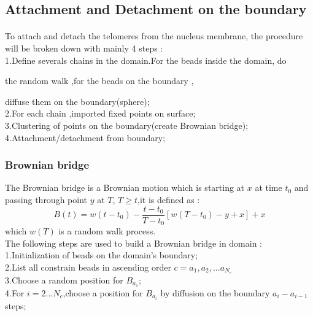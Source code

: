 \documentclass{article}
\begin{document}
\subsection{Attachment and Detachment on the boundary}
\paragraph{}
To attach and detach the telomeres from the nucleus membrane,
the procedure will be broken down with mainly 4 steps :\\

1.Define severals chains in the domain.For the beads inside the domain, do 

the random walk ,for the beads on the boundary ,

diffuse them on the boundary(sphere);\\

2.For each chain ,imported fixed points on surface;\\

3.Clustering of points on the boundary(create Brownian bridge);\\

4.Attachment/detachment from boundary;

\subsubsection{Brownian bridge}
The Brownian bridge is a Brownian motion which is starting at $x$ at time $t_0$ and passing through point $y$ at $T$, $T \geq t$,it is defined as :\\
\begin{equation}
B(t) = w(t-t_0)-\frac{t-t_0}{T-t_0}[w(T-t_0)-y+x]+x
\end{equation}
which $w(T)$ is a random walk process.\\
The following steps are used to build a Brownian bridge in domain :\\

1.Initialization of beads on the domain's boundary;\\

2.List all constrain beads in ascending order $c={a_1,a_2,...a_{N_c}}$\\

3.Choose a random position for $B_{a_1}$;\\

4.For $i =2...N_c$,choose a position for $B_{a_i}$ by diffusion on the boundary $a_i -a_{i-1}$ steps;\\
\end{document}
